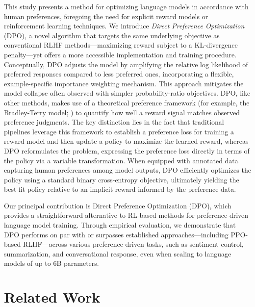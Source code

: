This study presents a method for optimizing language models in accordance with human preferences, foregoing the need for explicit reward models or reinforcement learning techniques. We introduce \textit{Direct Preference Optimization} (DPO), a novel algorithm that targets the same underlying objective as conventional RLHF methods—maximizing reward subject to a KL-divergence penalty—yet offers a more accessible implementation and training procedure. Conceptually, DPO adjusts the model by amplifying the relative log likelihood of preferred responses compared to less preferred ones, incorporating a flexible, example-specific importance weighting mechanism. This approach mitigates the model collapse often observed with simpler probability-ratio objectives. DPO, like other methods, makes use of a theoretical preference framework (for example, the Bradley-Terry model; \cite{bradley1952rankanalysis}) to quantify how well a reward signal matches observed preference judgments. The key distinction lies in the fact that traditional pipelines leverage this framework to establish a preference loss for training a reward model and then update a policy to maximize the learned reward, whereas DPO reformulates the problem, expressing the preference loss directly in terms of the policy via a variable transformation. When equipped with annotated data capturing human preferences among model outputs, DPO efficiently optimizes the policy using a standard binary cross-entropy objective, ultimately yielding the best-fit policy relative to an implicit reward informed by the preference data.

Our principal contribution is Direct Preference Optimization (DPO), which provides a straightforward alternative to RL-based methods for preference-driven language model training. Through empirical evaluation, we demonstrate that DPO performs on par with or surpasses established approaches—including PPO-based RLHF—across various preference-driven tasks, such as sentiment control, summarization, and conversational response, even when scaling to language models of up to 6B parameters.

\section{Related Work}

